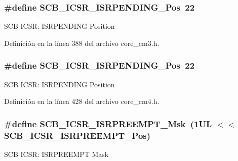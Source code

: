 \subsubsection[{\texorpdfstring{S\+C\+B\+\_\+\+I\+C\+S\+R\+\_\+\+I\+S\+R\+P\+E\+N\+D\+I\+N\+G\+\_\+\+Pos}{SCB_ICSR_ISRPENDING_Pos}}]{\setlength{\rightskip}{0pt plus 5cm}\#define S\+C\+B\+\_\+\+I\+C\+S\+R\+\_\+\+I\+S\+R\+P\+E\+N\+D\+I\+N\+G\+\_\+\+Pos~22}\hypertarget{group___c_m_s_i_s___s_c_b_ga10749d92b9b744094b845c2eb46d4319}{}\label{group___c_m_s_i_s___s_c_b_ga10749d92b9b744094b845c2eb46d4319}
S\+CB I\+C\+SR\+: I\+S\+R\+P\+E\+N\+D\+I\+NG Position 

Definición en la línea 388 del archivo core\+\_\+cm3.\+h.

\subsubsection[{\texorpdfstring{S\+C\+B\+\_\+\+I\+C\+S\+R\+\_\+\+I\+S\+R\+P\+E\+N\+D\+I\+N\+G\+\_\+\+Pos}{SCB_ICSR_ISRPENDING_Pos}}]{\setlength{\rightskip}{0pt plus 5cm}\#define S\+C\+B\+\_\+\+I\+C\+S\+R\+\_\+\+I\+S\+R\+P\+E\+N\+D\+I\+N\+G\+\_\+\+Pos~22}\hypertarget{group___c_m_s_i_s___s_c_b_ga10749d92b9b744094b845c2eb46d4319}{}\label{group___c_m_s_i_s___s_c_b_ga10749d92b9b744094b845c2eb46d4319}
S\+CB I\+C\+SR\+: I\+S\+R\+P\+E\+N\+D\+I\+NG Position 

Definición en la línea 428 del archivo core\+\_\+cm4.\+h.

\subsubsection[{\texorpdfstring{S\+C\+B\+\_\+\+I\+C\+S\+R\+\_\+\+I\+S\+R\+P\+R\+E\+E\+M\+P\+T\+\_\+\+Msk}{SCB_ICSR_ISRPREEMPT_Msk}}]{\setlength{\rightskip}{0pt plus 5cm}\#define S\+C\+B\+\_\+\+I\+C\+S\+R\+\_\+\+I\+S\+R\+P\+R\+E\+E\+M\+P\+T\+\_\+\+Msk~(1\+U\+L $<$$<$ S\+C\+B\+\_\+\+I\+C\+S\+R\+\_\+\+I\+S\+R\+P\+R\+E\+E\+M\+P\+T\+\_\+\+Pos)}\hypertarget{group___c_m_s_i_s___s_c_b_gaa966600396290808d596fe96e92ca2b5}{}\label{group___c_m_s_i_s___s_c_b_gaa966600396290808d596fe96e92ca2b5}
S\+CB I\+C\+SR\+: I\+S\+R\+P\+R\+E\+E\+M\+PT Mask 

